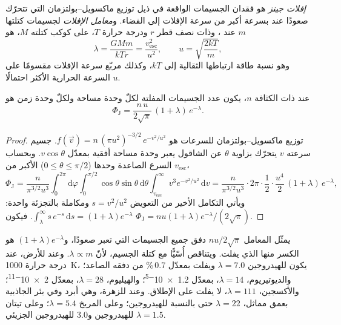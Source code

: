 \begin{definition}\label{def:b3:planetary-atmospheres:jeans-escape}
\emph{إفلات جينز} هو فقدان الجسيمات الواقعة في ذيل توزيع ماكسويل--بولتزمان
التي تتحرّك صعودًا عند 
بسرعة أكبر من سرعة الإفلات إلى الفضاء. و\emph{معامل
الإفلات} لجسيمات كتلتها $m$ عند ،
وذات نصف قطر $r$ ودرجة حرارة $T$، على كوكب كتلته $M$، هو
\[
\lambda = \frac{GMm}{kTr} = \frac{v_\mathrm{esc}^2}{u^2},
\qquad u = \sqrt{\frac{2kT}m},
\]
وهو نسبة طاقة ارتباطها الثقالية إلى $kT$، وكذلك مربّع سرعة
الإفلات مقسومًا على السرعة الحرارية الأكثر احتمالًا $u$.
\end{definition}

\begin{theorem}\label{thm:b3:planetary-atmospheres:jeans}
عند  ذات الكثافة $n$، يكون عدد الجسيمات المفلتة
لكلّ وحدة مساحة ولكلّ وحدة زمن هو
\[
\Phi_\mathrm J = \frac{n\,u}{2\sqrt\pi}\,(1 + \lambda)\,e^{-\lambda}.
\]
\end{theorem}

\begin{proof}
توزيع ماكسويل--بولتزمان للسرعات هو $f(\vec v) =
n\,(\pi u^2)^{-3/2}\,e^{-v^2/u^2}$. جسيم سرعته $v$ يتحرّك بزاوية
$\theta$ عن الشاقول يعبر وحدة مساحة أفقية بمعدّل
$v\cos\theta$. وبحساب السرع الصاعدة وحدها ($0 \le \theta \le
\pi/2$) الأكبر من $v_\mathrm{esc}$،
\[
\Phi_\mathrm J = \frac{n}{\pi^{3/2}u^3}\int_0^{2\pi}\!\!\mathrm d\varphi
\int_0^{\pi/2}\!\!\cos\theta\sin\theta\,\mathrm d\theta
\int_{v_\mathrm{esc}}^\infty v^3e^{-v^2/u^2}\,\mathrm dv
= \frac{n}{\pi^{3/2}u^3}\cdot2\pi\cdot\frac12\cdot
\frac{u^4}2\,(1 + \lambda)\,e^{-\lambda},
\]
ويأتي التكامل الأخير من التعويض $s = v^2/u^2$
ومكاملة بالتجزئة واحدة: $\int_\lambda^\infty s\,e^{-s}\,\mathrm ds =
(1 + \lambda)e^{-\lambda}$. فيكون $\Phi_\mathrm J = n u (1 +
\lambda) e^{-\lambda}/(2\sqrt\pi)$.
\end{proof}

يمثّل المعامل $n u/2\sqrt\pi$ دفق جميع الجسيمات التي تعبر
 صعودًا، و$(1 + \lambda)e^{-\lambda}$ هو الكسر
منها الذي يفلت. ويتناقص أُسّيًّا مع كتلة الجسيم، لأنّ
$\lambda \propto m$. وعند  للأرض، عند درجة حرارة \qty{1000}{K}، يكون للهيدروجين
$\lambda = 7.0$ ويفلت بمعدّل 0.7\,\% من
دفقه الصاعد؛ والديوتيريوم، $\lambda = 14$، بمعدّل \num{1.2e-5}؛ والهيليوم، $\lambda = 28$،
بمعدّل \num{2e-11}؛ والأكسجين، $\lambda = 111$، لا يفلت على الإطلاق. وعند 
للزهرة، وهي أبرد وفي بئر الجاذبية بعمق مماثل، $\lambda = 22$ حتى
بالنسبة للهيدروجين؛ وعلى المريخ $\lambda = 5.4$؛ وعلى تيتان $\lambda = 1.5$ للهيدروجين و3.0
للهيدروجين الجزيئي.

